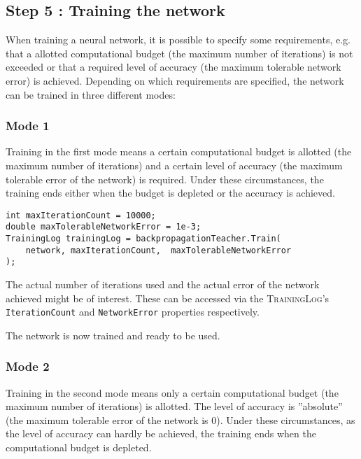 \subsection{Step 5 : Training the network}

When training a neural network, it is possible to specify some requirements, e.g. that a allotted computational budget (the maximum number of iterations) is not exceeded or that a required level of accuracy (the maximum tolerable network error) is achieved. Depending on which requirements are specified, the network can be trained in three different modes:

\subsubsection{Mode 1}

Training in the first mode means a certain computational budget is allotted (the maximum number of iterations) and a certain level of accuracy (the maximum tolerable error of the network) is required. Under these circumstances, the training ends either when the budget is depleted or the accuracy is achieved. 

\medskip

\begin{verbatim}
int maxIterationCount = 10000;
double maxTolerableNetworkError = 1e-3;
TrainingLog trainingLog = backpropagationTeacher.Train(
    network, maxIterationCount,  maxTolerableNetworkError
);
\end{verbatim}

\medskip

The actual number of iterations used and the actual error of the network achieved might be of interest. These can be accessed via the \textsc{TrainingLog}'s \texttt{IterationCount} and \texttt{NetworkError} properties respectively.
  
The network is now trained and ready to be used.
  
\subsubsection{Mode 2}

Training in the second mode means only a certain computational budget (the maximum number of iterations) is allotted. The level of accuracy is ''absolute'' (the maximum tolerable error of the network is 0). Under these circumstances, as the level of accuracy can hardly be achieved, the training ends when the computational budget is depleted.

